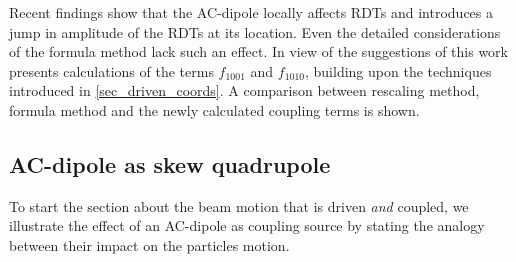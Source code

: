 Recent findings \cite{Carlier2020} show that the AC-dipole locally affects RDTs and introduces
a jump in amplitude of the RDTs at its location. Even the detailed considerations of the formula method lack such an effect.
In view of the suggestions of \cite{Carlier2020} this work presents calculations of the terms
$f_{1001}$ and $f_{1010}$, building upon the techniques introduced in \ref{sec_driven_coords}.
A comparison between rescaling method, formula method and the newly calculated coupling terms is shown.


\subsection{AC-dipole as skew quadrupole}
\label{sec_acd_as_skew}

To start the section about the beam motion that is driven \emph{and} coupled,
we illustrate the effect of an AC-dipole as coupling source by stating the analogy between their
impact on the particles motion.

